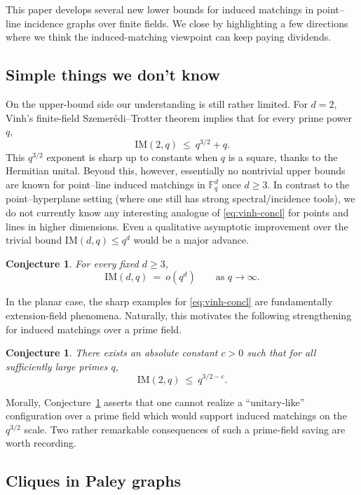 \documentclass[12pt,reqno]{amsart}
\theoremstyle{plain}
\newtheorem{conj}[theorem]{Conjecture}
\theoremstyle{definition}
\newcommand{\F}{\mathbb{F}}
\newcommand{\IM}{\mathrm{IM}}
\newcommand{\1}{\mathbf{1}}
\begin{document}
This paper develops several new lower bounds for induced matchings in point--line incidence graphs over finite fields.
We close by highlighting a few directions where we think the induced-matching viewpoint can keep paying dividends.

\subsection*{Simple things we don't know}

On the upper-bound side our understanding is still rather limited.
For $d=2$, Vinh's finite-field Szemer\'edi--Trotter theorem \cite{Vinh2011ST} implies that for every prime power $q$,
\begin{equation}\label{eq:vinh-concl}
  \IM(2,q)\ \le\ q^{3/2}+q.
\end{equation}
This $q^{3/2}$ exponent is sharp up to constants when $q$ is a square, thanks to the Hermitian unital.
Beyond this, however, essentially no nontrivial upper bounds are known for point--line induced matchings in $\F_q^d$ once $d\ge 3$.
In contrast to the point--hyperplane setting (where one still has strong spectral/incidence tools),
we do not currently know any interesting analogue of \eqref{eq:vinh-concl} for points and lines in higher dimensions. Even a qualitative asymptotic improvement over the trivial bound $\IM(d,q)\le q^d$ would be a major advance. 

\begin{conj}\label{conj:highd-oqd}
For every fixed $d\ge 3$,
\[
  \IM(d,q)\ =\ o(q^d)\qquad \text{as }q\to\infty.
\]
\end{conj}

In the planar case, the sharp examples for \eqref{eq:vinh-concl} are fundamentally extension-field phenomena.
Naturally, this motivates the following strengthening for induced matchings over a prime field. 

\begin{conj}\label{conj:prime-saving}
There exists an absolute constant $c>0$ such that for all sufficiently large \emph{primes} $q$,
\[
  \IM(2,q)\ \le\ q^{3/2-c}.
\]
\end{conj}

Morally, Conjecture~\ref{conj:prime-saving} asserts that one cannot realize a ``unitary-like'' configuration over a prime field which would support induced matchings on the $q^{3/2}$ scale.  Two rather remarkable consequences of such a prime-field saving are worth recording.

\subsection*{Cliques in Paley graphs}
\end{document}
